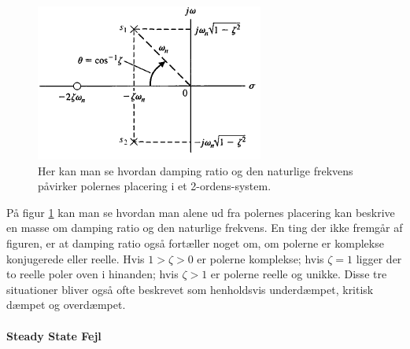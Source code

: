 \begin{figure}
\vspace{-20pt}
	\begin{center}
	\includegraphics[scale=0.9]{Billeder/SO_system.PNG}
	\end{center}
	\vspace{-10pt}
	\label{fig:SO_system}
	\caption{Her kan man se hvordan damping ratio og den naturlige frekvens påvirker polernes placering i et 2-ordens-system.}
\vspace{0pt}
\end{figure}

På figur \ref{fig:SO_system} kan man se hvordan man alene ud fra polernes placering kan beskrive en masse om damping ratio og den naturlige frekvens. En ting der ikke fremgår af figuren, er at damping ratio også fortæller noget om, om polerne er komplekse konjugerede eller reelle. Hvis $1>\zeta>0$ er polerne komplekse; hvis $\zeta=1$ ligger der to reelle poler oven i hinanden; hvis $\zeta>1$ er polerne reelle og unikke. Disse tre situationer bliver også ofte beskrevet som henholdsvis underdæmpet, kritisk dæmpet og overdæmpet.


\paragraph{Steady State Fejl}

